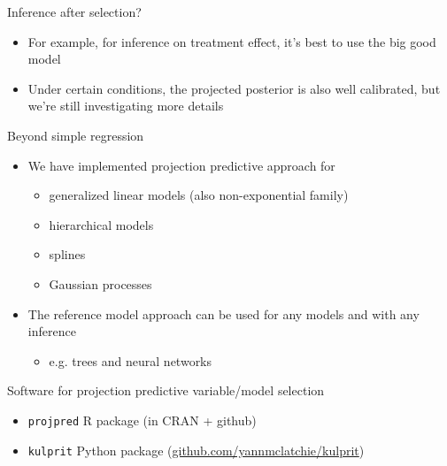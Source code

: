 \documentclass[english,t]{beamer}
\begin{document}
\begin{frame}{Inference after selection?}

  \begin{itemize}
  \item For example, for inference on treatment effect, it's best to
    use the big good model
  \item Under certain conditions, the projected posterior is also well
    calibrated, but we're still investigating more details
  \end{itemize}

\end{frame}

\begin{frame}{Beyond simple regression}

  \begin{itemize}
  \item We have implemented projection predictive approach for
    \begin{itemize}
    \item generalized linear models (also non-exponential family)
    \item hierarchical models
    \item splines
    \item Gaussian processes
    \end{itemize}
  \item<2-> The reference model approach can be used for any models
    and with any inference
    \begin{itemize}
    \item e.g. trees and neural networks
    \end{itemize}
  \end{itemize}

\end{frame}

\begin{frame}{Software for projection predictive variable/model selection}

  \begin{itemize}
  \item \texttt{projpred} R package (in CRAN + github)
  \item \texttt{kulprit} Python package (\url{github.com/yannmclatchie/kulprit})
  \end{itemize}

\end{frame}
\end{document}
